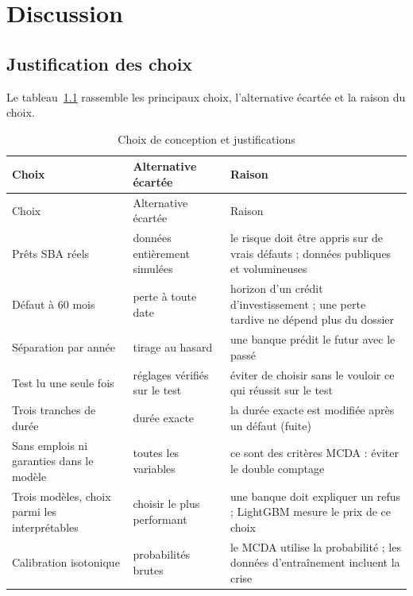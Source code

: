 \chapter{Discussion}\label{chap:discussion}

\section{Justification des choix}

Le tableau~\ref{tab:choix} rassemble les principaux choix, l'alternative écartée et la raison du choix.

\begin{center}
\footnotesize
\begin{longtable}{>{\raggedright\arraybackslash}p{3.6cm}>{\raggedright\arraybackslash}p{3.2cm}>{\raggedright\arraybackslash}p{7.4cm}}
\caption{Choix de conception et justifications}\label{tab:choix}\\
\toprule
Choix & Alternative écartée & Raison \\
\midrule
\endfirsthead
\toprule
Choix & Alternative écartée & Raison \\
\midrule
\endhead
\bottomrule
\endfoot
Prêts SBA réels & données entièrement simulées & le risque doit être appris sur de vrais défauts ; données publiques et volumineuses \\
Défaut à 60 mois & perte à toute date & horizon d'un crédit d'investissement ; une perte tardive ne dépend plus du dossier \\
Séparation par année & tirage au hasard & une banque prédit le futur avec le passé \\
Test lu une seule fois & réglages vérifiés sur le test & éviter de choisir sans le vouloir ce qui réussit sur le test \\
Trois tranches de durée & durée exacte & la durée exacte est modifiée après un défaut (fuite) \\
Sans emplois ni garanties dans le modèle & toutes les variables & ce sont des critères MCDA : éviter le double comptage \\
Trois modèles, choix parmi les interprétables & choisir le plus performant & une banque doit expliquer un refus ; LightGBM mesure le prix de ce choix \\
Calibration isotonique & probabilités brutes & le MCDA utilise la probabilité ; les données d'entraînement incluent la crise \\

\end{longtable}
\end{center}
